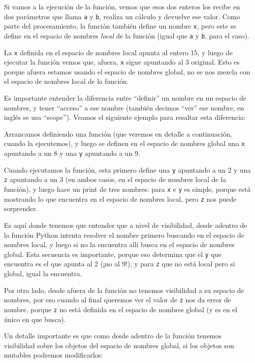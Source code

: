 Si vamos a la ejecución de la función, vemos que esos dos enteros los recibe en dos parámetros que llama \verb|a| y \verb|b|, realiza un cálculo y devuelve ese valor. Como parte del procesamiento, la función también define un nombre \verb|x|, pero este se define en el espacio de nombres \textit{local} de la función (igual que \verb|a| y \verb|b|, para el caso).

La \verb|x| definida en el espacio de nombres local apunta al entero 15, y luego de ejecutar la función vemos que, afuera, \verb|x| sigue apuntando al 3 original. Esto es porque afuera estamos usando el espacio de nombres global, no se nos mezcla con el espacio de nombres local de la función.

Es importante entender la diferencia entre ``definir'' un nombre en un espacio de nombres, y tener ``acceso'' a ese nombre (también decimos ``ver'' ese nombre, en inglés se usa ``scope''). Veamos el siguiente ejemplo para resaltar esta diferencia:


Arrancamos definiendo una función (que veremos en detalle a continuación, cuando la ejecutemos), y luego se definen en el espacio de nombres global una \verb|x| apuntando a un 8 y una \verb|y| apuntando a un 9.

Cuando ejecutamos la función, esta primero define una \verb|y| apuntando a un 2 y una \verb|z| apuntando a un 3 (en ambos casos, en el espacio de nombres local de la función), y luego hace un print de tres nombres: para \verb|x| e \verb|y| es simple, porque está mostrando lo que encuentra en el espacio de nombres local, pero \verb|z| nos puede sorprender. 

Es aquí donde tenemos que entender que a nivel de visibilidad, desde adentro de la función Python intenta resolver el nombre primero buscando en el espacio de nombres local, y luego si no la encuentra allí busca en el espacio de nombres global. Esta secuencia es importante, porque eso determina que el \verb|y| que encuentra es el que apunta al 2 (¡no al 9!), y para \verb|z| que no está local pero si global, igual la encuentra.

Por otro lado, desde afuera de la función no tenemos visibilidad a su espacio de nombres, por eso cuando al final queremos ver el valor de \verb|z| nos da error de nombre, porque \verb|z| no está definida en el espacio de nombres global (y es en el único en que busca).

Un detalle importante es que como desde adentro de la función tenemos visibilidad sobre los objetos del espacio de nombres global, si los objetos son mutables podremos modificarlos:

